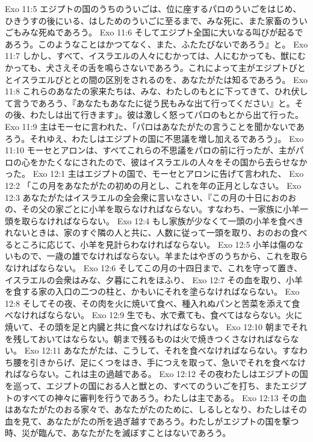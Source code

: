 Exo 11:5  エジプトの国のうちのういごは、位に座するパロのういごをはじめ、ひきうすの後にいる、はしためのういごに至るまで、みな死に、また家畜のういごもみな死ぬであろう。
Exo 11:6  そしてエジプト全国に大いなる叫びが起るであろう。このようなことはかつてなく、また、ふたたびないであろう』と。
Exo 11:7  しかし、すべて、イスラエルの人々にむかっては、人にむかっても、獣にむかっても、犬さえその舌を鳴らさないであろう。これによって主がエジプトびととイスラエルびととの間の区別をされるのを、あなたがたは知るであろう。
Exo 11:8  これらのあなたの家来たちは、みな、わたしのもとに下ってきて、ひれ伏して言うであろう、『あなたもあなたに従う民もみな出て行ってください』と。その後、わたしは出て行きます」。彼は激しく怒ってパロのもとから出て行った。
Exo 11:9  主はモーセに言われた、「パロはあなたがたの言うことを聞かないであろう。それゆえ、わたしはエジプトの国に不思議を増し加えるであろう」。
Exo 11:10  モーセとアロンは、すべてこれらの不思議をパロの前に行ったが、主がパロの心をかたくなにされたので、彼はイスラエルの人々をその国から去らせなかった。
Exo 12:1  主はエジプトの国で、モーセとアロンに告げて言われた、
Exo 12:2  「この月をあなたがたの初めの月とし、これを年の正月としなさい。
Exo 12:3  あなたがたはイスラエルの全会衆に言いなさい、『この月の十日におのおの、その父の家ごとに小羊を取らなければならない。すなわち、一家族に小羊一頭を取らなければならない。
Exo 12:4  もし家族が少なくて一頭の小羊を食べきれないときは、家のすぐ隣の人と共に、人数に従って一頭を取り、おのおの食べるところに応じて、小羊を見計らわなければならない。
Exo 12:5  小羊は傷のないもので、一歳の雄でなければならない。羊またはやぎのうちから、これを取らなければならない。
Exo 12:6  そしてこの月の十四日まで、これを守って置き、イスラエルの会衆はみな、夕暮にこれをほふり、
Exo 12:7  その血を取り、小羊を食する家の入口の二つの柱と、かもいにそれを塗らなければならない。
Exo 12:8  そしてその夜、その肉を火に焼いて食べ、種入れぬパンと苦菜を添えて食べなければならない。
Exo 12:9  生でも、水で煮ても、食べてはならない。火に焼いて、その頭を足と内臓と共に食べなければならない。
Exo 12:10  朝までそれを残しておいてはならない。朝まで残るものは火で焼きつくさなければならない。
Exo 12:11  あなたがたは、こうして、それを食べなければならない。すなわち腰を引きからげ、足にくつをはき、手につえを取って、急いでそれを食べなければならない。これは主の過越である。
Exo 12:12  その夜わたしはエジプトの国を巡って、エジプトの国におる人と獣との、すべてのういごを打ち、またエジプトのすべての神々に審判を行うであろう。わたしは主である。
Exo 12:13  その血はあなたがたのおる家々で、あなたがたのために、しるしとなり、わたしはその血を見て、あなたがたの所を過ぎ越すであろう。わたしがエジプトの国を撃つ時、災が臨んで、あなたがたを滅ぼすことはないであろう。
